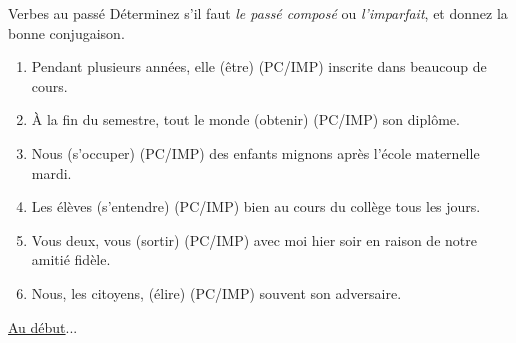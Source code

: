 \begin{frame}{Verbes au passé}
  \small
  Déterminez s'il faut \emph{le passé composé} ou \emph{l'imparfait}, et donnez la bonne conjugaison.
  \begin{enumerate}
    \item Pendant plusieurs années, elle \underline{} (être) (PC/\alert<2->{IMP}) inscrite dans beaucoup de cours.
    \item À la fin du semestre, tout le monde \underline{} (obtenir) (\alert<3->{PC}/IMP) son diplôme.
    \item Nous \underline{} (s'occuper) (\alert<4->{PC}/IMP) des enfants mignons après l'école maternelle mardi.
    \item Les élèves \underline{} (s'entendre) (PC/\alert<5->{IMP}) bien au cours du collège tous les jours.
    \item Vous deux, vous \underline{} (sortir) (\alert<6->{PC}/IMP) avec moi hier soir en raison de notre amitié fidèle.
    \item Nous, les citoyens, \underline{} (élire) (PC/\alert<7->{IMP}) souvent son adversaire.
  \end{enumerate}
  \raggedleft\raggedleft\hyperlink{début}{Au début}...
\end{frame}